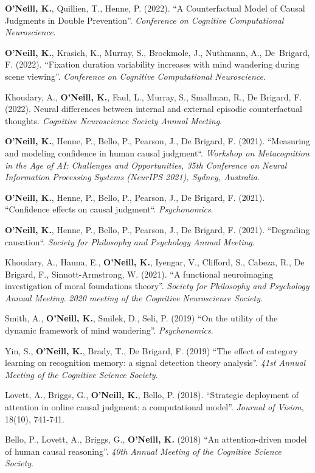 \textbf{O'Neill, K.}, Quillien, T., Henne, P. (2022). ``A
Counterfactual Model of Causal Judgments in Double
Prevention''. \emph{Conference on Cognitive Computational
Neuroscience}.

\textbf{O'Neill, K.}, Krasich, K., Murray, S., Brockmole, J.,
Nuthmann, A., De~Brigard, F. (2022). ``Fixation duration variability
increases with mind wandering during scene viewing''. \emph{Conference
on Cognitive Computational Neuroscience}.

Khoudary, A., \textbf{O’Neill, K.}, Faul, L., Murray, S., Smallman,
R., De Brigard, F. (2022). Neural differences between internal and
external episodic counterfactual thoughts. \emph{Cognitive
Neuroscience Society Annual Meeting}.

\textbf{O'Neill, K.}, Henne, P., Bello, P., Pearson, J., De Brigard,
F. (2021). ``Measuring and modeling confidence in human causal
judgment``. \emph{Workshop on Metacognition in the Age of AI:
Challenges and Opportunities, 35th Conference on Neural Information
Processing Systems (NeurIPS 2021), Sydney, Australia}.

\textbf{O'Neill, K.}, Henne, P., Bello, P., Pearson, J., De Brigard,
F. (2021). ``Confidence effects on causal
judgment``. \emph{Psychonomics}.

\textbf{O'Neill, K.}, Henne, P., Bello, P., Pearson, J., De Brigard,
F. (2021). ``Degrading causation``. \emph{Society for Philosophy and
Psychology Annual Meeting}.

Khoudary, A., Hanna, E., \textbf{O’Neill, K.}, Iyengar, V., Clifford,
S., Cabeza, R., De Brigard, F., Sinnott-Armstrong, W. (2021). ``A
functional neuroimaging investigation of moral foundations
theory''. \emph{Society for Philosophy and Psychology Annual
Meeting}. \emph{2020 meeting of the Cognitive Neuroscience Society}.

Smith, A., \textbf{O'Neill, K.}, Smilek, D., Seli, P. (2019) ``On the
utility of the dynamic framework of mind
wandering''. \emph{Psychonomics}.

Yin, S., \textbf{O'Neill, K.}, Brady, T., De Brigard, F. (2019) ``The
effect of category learning on recognition memory: a signal detection
theory analysis''. \emph{41st Annual Meeting of the Cognitive Science
Society}.

Lovett, A., Briggs, G., \textbf{O'Neill, K.}, Bello,
P. (2018). ``Strategic deployment of attention in online causal
judgment: a computational model''. \emph{Journal of Vision}, 18(10),
741-741.

Bello, P., Lovett, A., Briggs, G., \textbf{O'Neill, K.} (2018) ``An
attention-driven model of human causal reasoning''. \emph{40th Annual
Meeting of the Cognitive Science Society}.
